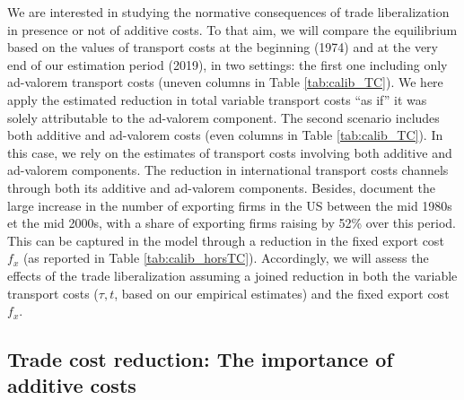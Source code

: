 \documentclass[a4paper,11pt]{article}
\begin{document}
We are interested in studying the normative consequences of trade liberalization in presence or not of additive costs. To that aim, we will compare the equilibrium based on the values of transport costs at the beginning (1974) and at the very end of our estimation period (2019), in two settings: the first one including only ad-valorem transport costs (uneven columns in Table \ref{tab:calib_TC}). We here apply the estimated reduction in total variable transport costs ``as if'' it was solely attributable to the ad-valorem component. The second scenario includes both additive and ad-valorem costs (even columns in Table \ref{tab:calib_TC}). In this case, we rely on the estimates of transport costs involving both additive and ad-valorem components. The reduction in international transport costs channels through both its additive and ad-valorem components. Besides, \cite{Lincoln_McCallum2018} document the large increase in the number of exporting firms in the US between the mid 1980s et the mid 2000s, with a share of exporting firms raising by 52\% over this period. This can be captured in the model through a reduction in the fixed export cost $f_x$ (as reported in Table \ref{tab:calib_horsTC}). Accordingly, we will assess the effects of the trade liberalization assuming a joined reduction in both the variable transport costs ($\tau, t$, based on our empirical estimates) and the fixed export cost $f_x$.



\subsection{Trade cost reduction: The importance of additive costs}
\end{document}

